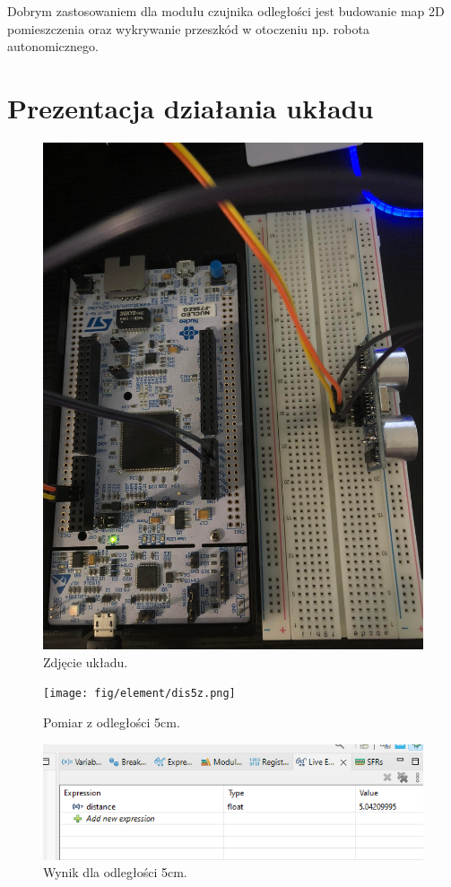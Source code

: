 \documentclass[11pt, a4paper]{article}
\begin{document}
Dobrym zastosowaniem dla modułu czujnika odległości jest budowanie map 2D pomieszczenia oraz wykrywanie przeszkód w otoczeniu np. robota autonomicznego. 

\newpage
\clearpage
\section{Prezentacja działania układu}

\vspace{0.5cm}
\begin{figure}[h!]
    \centering
    \includegraphics[width=.9\textwidth]{fig/element/foto1.png}
    \caption{Zdjęcie układu.}
    \label{fig:my_label}
\end{figure}

\vspace{0.5cm}
\begin{figure}[h!]
    \centering
    \texttt{[image: fig/element/dis5z.png]}
    \caption{Pomiar z odległości 5cm.}
    \label{fig:my_label}
\end{figure}

\vspace{0.5cm}
\begin{figure}[h!]
    \centering
    \includegraphics[width=\textwidth]{fig/element/dis5.png}
    \caption{Wynik dla odległości 5cm.}
    \label{fig:my_label}
\end{figure}
\end{document}
